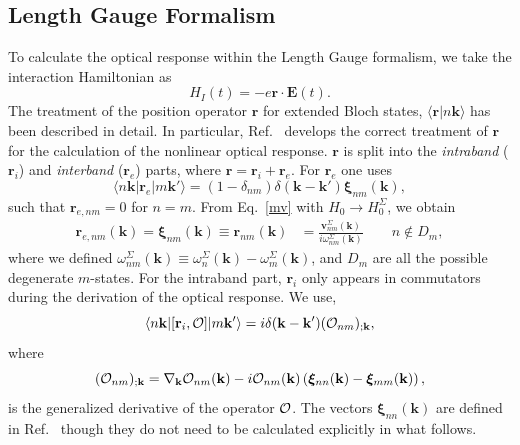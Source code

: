 \documentclass[floatfix,prb,aps,superscriptaddress,showpacs,letterpaper]{revtex4}
\begin{document}
\subsection{Length Gauge Formalism}
To calculate the optical response 
within the Length Gauge formalism, we take the 
interaction Hamiltonian as
\begin{equation}
H_{I}(t)=-e\mathbf{r}\cdot \mathbf{E}(t).
\label{rde}
\end{equation}
The 
treatment of the position operator
$\mathbf{r}$ for extended Bloch states, $\langle\mathbf{r}|n\mathbf{k}\rangle$ has 
been described in detail.\cite{adamsJCP53,blountSSP62} 
In particular, Ref.~ develops
the correct treatment of $\mathbf{r}$ for
the calculation of the nonlinear optical response.
$\mathbf{r}$ is split into the {\it intraband} 
($\mathbf{r}_i$) and {\it interband} ($\mathbf{r}_e$) parts, where 
$\mathbf{r}=\mathbf{r}_i+\mathbf{r}_e$. 
For $\mathbf{r}_e$ one uses
\begin{equation}
\langle n\mathbf{k} | \mathbf{r}_e | m\mathbf{k}'\rangle =
(1-\delta_{nm})\delta(\mathbf{k}-\mathbf{k}')\boldsymbol{\xi}_{nm}(\mathbf{k})
,
\label{rnminn}
\end{equation}
such that $\mathbf{r}_{e,nm}=0$ for $n=m$.
From Eq.~\eqref{mv} with $H_0\to
H^\Sigma_0$, we obtain
\begin{align}
\mathbf{r}_{e,nm}(\mathbf{k}) =
\boldsymbol{\xi}_{nm}(\mathbf{k})\equiv 
\mathbf{r}_{nm}(\mathbf{k}) 
&=
\frac{\mathbf{v}^\Sigma_{nm}(\mathbf{k})}{i\omega^\Sigma_{nm}(\mathbf{k})}
\quad\quad n\notin D_m 
,
\label{pmnrmn}
\end{align}  
where we defined
$\omega^\Sigma_{nm}(\mathbf{k})\equiv\omega^\Sigma_n(\mathbf{k})-\omega^\Sigma_m(\mathbf{k})$, and
$D_m$ are all the possible degenerate $m$-states. 
For the intraband part, $\mathbf{r}_i$ only appears in
commutators during the derivation of
the optical response. We use,\cite{aversaPRB95}
\begin{equation}
\langle n\mathbf{k} | [\mathbf{r}_i,{\cal O}] | m\mathbf{k}'\rangle
=i\delta(\mathbf{k}-\mathbf{k}')({\cal O}_{nm})_{;\mathbf{k}},
\label{conmri3n}
\end{equation}  
where
\begin{equation}
({\cal O}_{nm})_{;\mathbf{k}}=
\nabla_\mathbf{k} 
{\cal O}_{n m}(\mathbf{k}) 
- 
i 
{\cal O}_{nm}(\mathbf{k}) 
\left(
\boldsymbol{\xi}_{nn}(\mathbf{k}) 
-
\boldsymbol{\xi}_{mm}(\mathbf{k}) 
\right) 
,
\label{gendevnn}
\end{equation} 
is
the generalized derivative 
of the operator ${\cal O}$. 
The vectors $\boldsymbol{\xi}_{nn}(\mathbf{k})$ are defined in 
Ref.~ though they do not need to be 
calculated explicitly in what follows. 
\end{document}

